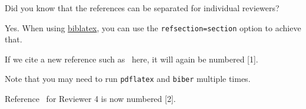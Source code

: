 
\begin{revcomment}
    Did you know that the references can be separated for individual reviewers?
\end{revcomment}
\begin{revresponse}
    Yes. When using \href{https://www.ctan.org/pkg/biblatex}{biblatex}, you can use the \texttt{refsection=section} option to achieve that.

    If we cite a new reference such as~\cite{J_NECO_hochreiter1997long} here, it will again be numbered [1].

    Note that you may need to run \texttt{pdflatex} and \texttt{biber} multiple times.

    Reference~\cite{J_NATURE_lecun2015deep} for Reviewer 4 is now numbered [2].
\end{revresponse}
